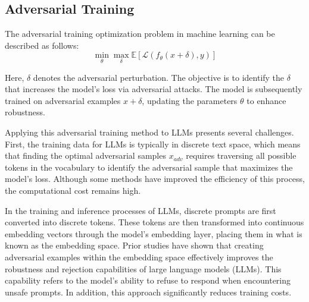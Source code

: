 \subsection{Adversarial Training}



The adversarial training optimization problem in machine learning can be described as follows:
\begin{equation}
\label{equa:AT1}
\min_{\theta} \max_{\delta} \mathbb{E} \left[ \mathcal{L} \left( f_{\theta} \left( x + \delta \right), y \right) \right]
\end{equation}

Here, $\delta$ denotes the adversarial perturbation. The objective is to identify the $\delta$ that increases the model's loss via adversarial attacks. The model is subsequently trained on adversarial examples $x + \delta$, updating the parameters $\theta$ to enhance robustness.


Applying this adversarial training method to LLMs presents several challenges. First, the training data for LLMs is typically in discrete text space, which means that finding the optimal adversarial samples $x_{adv}$ requires traversing all possible tokens in the vocabulary to identify the adversarial sample that maximizes the model's loss. Although some methods \cite{mazeika2024harmbenchstandardizedevaluationframework} have improved the efficiency of this process, the computational cost remains high.

In the training and inference processes of LLMs, discrete prompts are first converted into discrete tokens. These tokens are then transformed into continuous embedding vectors through the model's embedding layer, placing them in what is known as the embedding space. Prior studies \cite{xhonneux2024efficientadversarialtrainingllms} have shown that creating adversarial examples within the embedding space effectively improves the robustness and rejection capabilities of large language models (LLMs). This capability refers to the model's ability to refuse to respond when encountering unsafe prompts. In addition, this approach significantly reduces training costs. 


